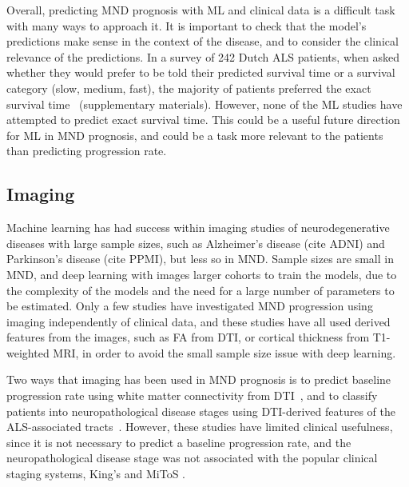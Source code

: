 Overall, predicting MND prognosis with ML and clinical data is a difficult task with many ways to approach it.
It is important to check that the model's predictions make sense in the context of the disease, and to consider the clinical relevance of the predictions.
In a survey of 242 Dutch ALS patients, when asked whether they would prefer to be told their predicted survival time or a survival category (slow, medium, fast), the majority of patients preferred the exact survival time~\cite{westenengPrognosisPatientsAmyotrophic2018} (supplementary materials).
However, none of the ML studies have attempted to predict exact survival time.
This could be a useful future direction for ML in MND prognosis, and could be a task more relevant to the patients than predicting progression rate.


\subsection{Imaging}

Machine learning has had success within imaging studies of neurodegenerative diseases with large sample sizes, such as Alzheimer's disease (cite ADNI) and Parkinson's disease (cite PPMI), but less so in MND.
Sample sizes are small in MND, and deep learning with images larger cohorts to train the models, due to the complexity of the models and the need for a large number of parameters to be estimated.
Only a few studies have investigated MND progression using imaging independently of clinical data, and these studies have all used derived features from the images, such as FA from DTI, or cortical thickness from T1-weighted MRI, in order to avoid the small sample size issue with deep learning.

Two ways that imaging has been used in MND prognosis is to predict baseline progression rate using white matter connectivity from DTI~\cite{liDisruptionWhiteMatter2021}, and to classify patients into neuropathological disease stages using DTI-derived features of the ALS-associated tracts~\cite{behlerMultivariateBayesianClassification2022}.
However, these studies have limited clinical usefulness, since it is not necessary to predict a baseline progression rate, and the neuropathological disease stage was not associated with the popular clinical staging systems, King's and MiToS .

